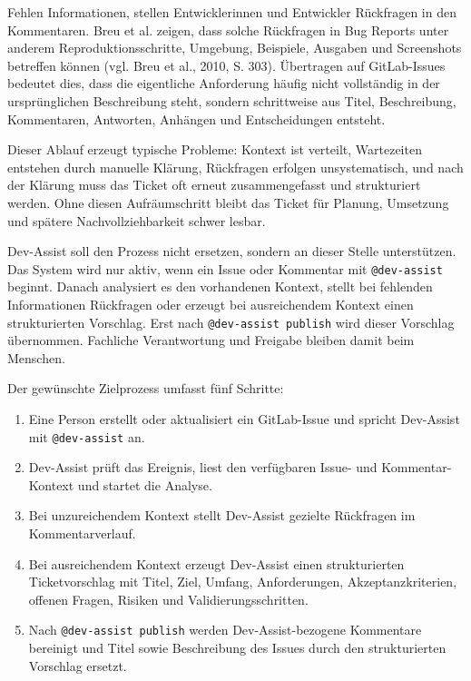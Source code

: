 \documentclass[12pt,a4paper,oneside]{scrreprt}
\begin{document}
Fehlen Informationen, stellen Entwicklerinnen und Entwickler Rückfragen in den Kommentaren. Breu et al. zeigen, dass solche Rückfragen in Bug Reports unter anderem Reproduktionsschritte, Umgebung, Beispiele, Ausgaben und Screenshots betreffen können (vgl. Breu et al., 2010, S. 303). Übertragen auf GitLab-Issues bedeutet dies, dass die eigentliche Anforderung häufig nicht vollständig in der ursprünglichen Beschreibung steht, sondern schrittweise aus Titel, Beschreibung, Kommentaren, Antworten, Anhängen und Entscheidungen entsteht.

Dieser Ablauf erzeugt typische Probleme: Kontext ist verteilt, Wartezeiten entstehen durch manuelle Klärung, Rückfragen erfolgen unsystematisch, und nach der Klärung muss das Ticket oft erneut zusammengefasst und strukturiert werden. Ohne diesen Aufräumschritt bleibt das Ticket für Planung, Umsetzung und spätere Nachvollziehbarkeit schwer lesbar.

Dev-Assist soll den Prozess nicht ersetzen, sondern an dieser Stelle unterstützen. Das System wird nur aktiv, wenn ein Issue oder Kommentar mit \texttt{@dev-assist} beginnt. Danach analysiert es den vorhandenen Kontext, stellt bei fehlenden Informationen Rückfragen oder erzeugt bei ausreichendem Kontext einen strukturierten Vorschlag. Erst nach \texttt{@dev-assist publish} wird dieser Vorschlag übernommen. Fachliche Verantwortung und Freigabe bleiben damit beim Menschen.

Der gewünschte Zielprozess umfasst fünf Schritte:

\begin{enumerate}
\item Eine Person erstellt oder aktualisiert ein GitLab-Issue und spricht Dev-Assist mit \texttt{@dev-assist} an.
\item Dev-Assist prüft das Ereignis, liest den verfügbaren Issue- und Kommentar-Kontext und startet die Analyse.
\item Bei unzureichendem Kontext stellt Dev-Assist gezielte Rückfragen im Kommentarverlauf.
\item Bei ausreichendem Kontext erzeugt Dev-Assist einen strukturierten Ticketvorschlag mit Titel, Ziel, Umfang, Anforderungen, Akzeptanzkriterien, offenen Fragen, Risiken und Validierungsschritten.
\item Nach \texttt{@dev-assist publish} werden Dev-Assist-bezogene Kommentare bereinigt und Titel sowie Beschreibung des Issues durch den strukturierten Vorschlag ersetzt.
\end{enumerate}
\end{document}
